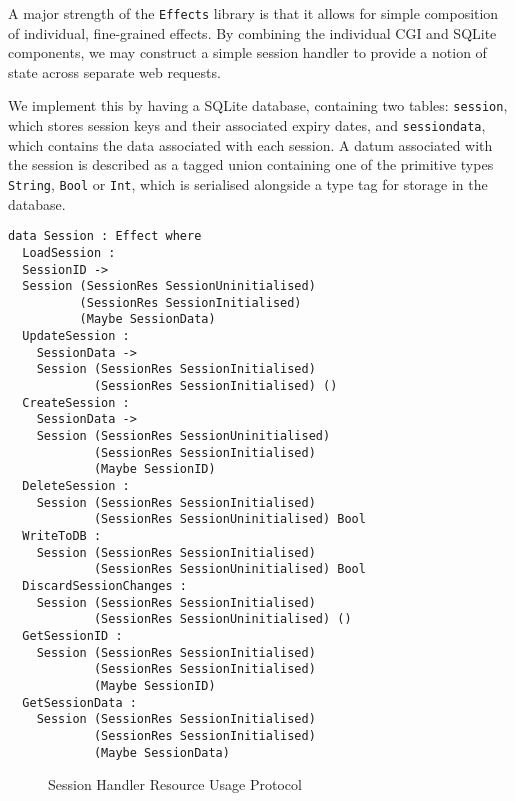 \documentclass[preprint]{sigplanconf}
\begin{document}
A major strength of the \texttt{Effects} library is that it allows for simple composition of individual, fine-grained effects. By combining the individual CGI and SQLite components, we may construct a simple session handler to provide a notion of state across separate web requests. 

We implement this by having a SQLite database, containing two tables: \texttt{session}, which stores session keys and their associated expiry dates, and \texttt{sessiondata}, which contains the data associated with each session. A datum associated with the session is described as a tagged union containing one of the primitive types \texttt{String}, \texttt{Bool} or \texttt{Int}, which is serialised alongside a type tag for storage in the database.
\begin{Verbatim}[samepage]
data Session : Effect where
  LoadSession : 
  SessionID -> 
  Session (SessionRes SessionUninitialised) 
          (SessionRes SessionInitialised) 
          (Maybe SessionData)
  UpdateSession : 
    SessionData -> 
    Session (SessionRes SessionInitialised) 
            (SessionRes SessionInitialised) ()
  CreateSession : 
    SessionData -> 
    Session (SessionRes SessionUninitialised) 
            (SessionRes SessionInitialised) 
            (Maybe SessionID)
  DeleteSession : 
    Session (SessionRes SessionInitialised) 
            (SessionRes SessionUninitialised) Bool 
  WriteToDB : 
    Session (SessionRes SessionInitialised) 
            (SessionRes SessionUninitialised) Bool
  DiscardSessionChanges : 
    Session (SessionRes SessionInitialised) 
            (SessionRes SessionUninitialised) ()
  GetSessionID : 
    Session (SessionRes SessionInitialised) 
            (SessionRes SessionInitialised) 
            (Maybe SessionID)
  GetSessionData : 
    Session (SessionRes SessionInitialised) 
            (SessionRes SessionInitialised) 
            (Maybe SessionData)
\end{Verbatim}
\begin{figure}[htpb!]
\centering
{}
\caption{Session Handler Resource Usage Protocol}
\label{fig:sessionstates}
\end{figure}
\end{document}
